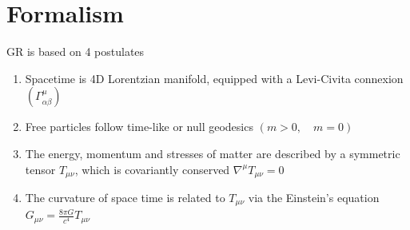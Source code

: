 \documentclass[a4paper]{book}
\theoremstyle{definition}
\theoremstyle{remark}
\begin{document}
\chapter{Formalism}

GR is based on 4 postulates 
\begin{enumerate}
    \item Spacetime is 4D Lorentzian manifold, equipped with a Levi-Civita connexion $(\Gamma^\mu_{\alpha\beta})$
    \item Free particles follow time-like or null geodesics $(m > 0, \quad m = 0)$
    \item The energy, momentum and stresses of matter are described by a symmetric tensor $T_{\mu\nu}$, which is covariantly conserved $\nabla^\mu T_{\mu\nu} = 0$
    \item The curvature of space time is related to $T_{\mu\nu}$ via the Einstein's equation $G_{\mu\nu} = \frac{8\pi G}{c^4}T_{\mu\nu}$
\end{enumerate}
\end{document}
